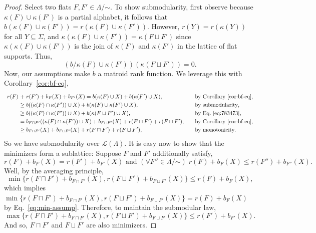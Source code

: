 \documentclass[11pt]{article}
\newcommand{\univ}{\Sigma}
\newcommand{\glang}{\Lambda}
\providecommand{\L}{}
\renewcommand{\L}{\mathscr{L}}
\begin{document}
\begin{proof}
    Select two flats $F,F'\in\glang/\mathord{\sim}$.
    To show submodularity, first observe because $\kappa(F)\cup\kappa(F')$ is a partial alphabet, it follows that $b(\kappa(F)\cup\kappa(F')) = r(\kappa(F)\cup\kappa(F'))$.
    However, $r(Y) = r(\kappa(Y))$ for all $Y\subseteq \univ$, and $\kappa(\kappa(F)\cup\kappa(F')) = \kappa(F\sqcup F')$ since $\kappa(\kappa(F)\cup\kappa(F'))$ is the join of $\kappa(F)$ and $\kappa(F')$ in the lattice of flat supports.
    Thus,
    \begin{equation}\label{eq:783473}
        \left(b/\kappa(F)\cup\kappa(F')\right)(\kappa(F\sqcup F')) = 0.
    \end{equation}
    Now, our assumptions make $b$ a matroid rank function.
    We leverage this with Corollary~\ref{cor:bf-eq},
    \begin{equation*} 
        \def\arraystretch{1.25}
        \begin{array}{lll}
            r(F) \!\!\!\!&+\; r(F') + b_F(X) + b_{F'}(X) = b(\kappa(F)\cup X) + b(\kappa(F') \cup X),\quad&\text{by Corollary~\ref{cor:bf-eq}},\\
                         &\geq b((\kappa(F)\cap\kappa(F'))\cup X) + b(\kappa(F)\cup\kappa(F')\cup X),\quad&\text{by submodularity},\\
                         &\geq b((\kappa(F)\cap\kappa(F'))\cup X) + b(\kappa(F\sqcup F')\cup X),\quad&\text{by Eq.~\ref{eq:783473}},\\
                                                      &= b_{F\sqcap F'}((\kappa(F)\cap\kappa(F'))\cup X) + b_{F\sqcup F'}(X) + r(F\sqcap F') + r(F\sqcap F'),\quad&\text{by Corollary~\ref{cor:bf-eq}},\\
                                                      &\geq b_{F\sqcap F'}(X) + b_{F\sqcup F'}(X) + r(F\sqcap F') + r(F\sqcup F'),\quad&\text{by monotonicity}.
        \end{array}
    \end{equation*}
    So we have submodularity over $\L(\glang)$.
    It is easy now to show that the minimizers form a sublattice: Suppose $F$ and $F'$ additionally satisfy,
    \begin{equation}\label{eq:min-assump}
        r(F) + b_F(X) = r(F') + b_{F'}(X)\text{ and }(\forall F'' \in \glang/\mathord{\sim})\;r(F) + b_F(X) \leq r(F'') + b_{F''}(X). 
    \end{equation}
    Well, by the averaging principle,
    \[
        \min\{r(F\sqcap F') + b_{F\sqcap F'}(X), r(F\sqcup F') + b_{F\sqcup F'}(X)\} \leq r(F) + b_F(X),
    \]
    which implies $\min\{r(F\sqcap F') + b_{F\sqcap F'}(X), r(F\sqcup F') + b_{F\sqcup F'}(X)\} = r(F) + b_F(X)$ by Eq.~\ref{eq:min-assump}.
    Therefore, to maintain the submodular law,
    \begin{equation*}
        \max\{r(F\sqcap F') + b_{F\sqcap F'}(X), r(F\sqcup F') + b_{F\sqcup F'}(X)\} \leq r(F') + b_{F'}(X).
    \end{equation*} 
    And so, $F\sqcap F'$ and $F\sqcup F'$ are also minimizers.
\end{proof}
\end{document}
